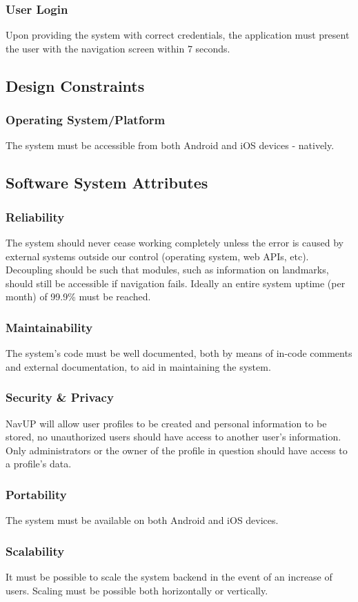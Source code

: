 \documentclass[12pt, a4paper]{article}
\begin{document}
		\subsubsection{User Login} Upon providing the system with correct credentials, the application must present the user with the navigation screen within 7 seconds. 
	\subsection{Design Constraints}
		\subsubsection{Operating System/Platform} The system must be accessible from both Android and iOS devices - natively.		
	\subsection{Software System Attributes}
		\subsubsection{Reliability} The system should never cease working completely unless the error is caused by external systems outside our control (operating system, web APIs, etc). Decoupling should be such that modules, such as information on landmarks, should still be accessible if navigation fails. Ideally an entire system uptime (per month) of 99.9\% must be reached.
		\subsubsection{Maintainability} The system's code must be well documented, both by means of in-code comments and external documentation, to aid in maintaining the system.
		\subsubsection{Security \& Privacy} NavUP will allow user profiles to be created and personal information to be stored, no unauthorized users should have access to another user's information. Only administrators or the owner of the profile in question should have access to a profile's data.
		\subsubsection{Portability} The system must be available on both Android and iOS devices.
		\subsubsection{Scalability} It must be possible to scale the system backend in the event of an increase of users. Scaling must be possible both horizontally or vertically.
\end{document}
